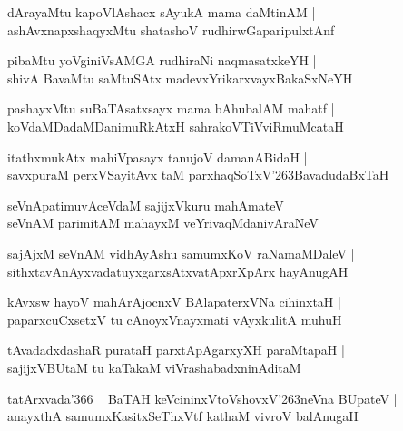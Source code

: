 \documentclass[twoside,12pt,openright]{book}
\def\S{\char'263}
\newcounter{shloka}[chapter]
\begin{document}
\begin{shloka}%
dArayaMtu kapoVlAshacx sAyukA mama daMtinAM |\\
ashAvxnapxshaqyxMtu shatashoV rudhirwGaparipulxtAnf 
\end{shloka}

\begin{shloka}%
pibaMtu yoVginiVsAMGA rudhiraNi naqmasatxkeYH |\\
shivA BavaMtu saMtuSAtx madevxYrikarxvayxBakaSxNeYH 
\end{shloka}

\begin{shloka}%
pashayxMtu suBaTAsatxsayx mama bAhubalAM mahatf |\\
koVdaMDadaMDanimuRkAtxH sahrakoVTiVviRmuMcataH 
\end{shloka}

\begin{shloka}%
itathxmukAtx mahiVpasayx tanujoV damanABidaH |\\
savxpuraM perxVSayitAvx taM parxhaqSoTxV\S BavadudaBxTaH
\end{shloka}

\begin{shloka}%
seVnApatimuvAceVdaM sajijxVkuru mahAmateV |\\
seVnAM parimitAM mahayxM veYrivaqMdanivAraNeV 
\end{shloka}

\begin{shloka}%
sajAjxM seVnAM vidhAyAshu samumxKoV raNamaMDaleV |\\
sithxtavAnAyxvadatuyxgarxsAtxvatApxrXpArx hayAnugAH
\end{shloka}

\begin{shloka}%
kAvxsw hayoV mahArAjocnxV BAlapaterxVNa cihinxtaH |\\
paparxcuCxsetxV tu cAnoyxVnayxmati vAyxkulitA muhuH 
\end{shloka}

\begin{shloka}%
tAvadadxdashaR purataH parxtApAgarxyXH paraMtapaH |\\
sajijxVBUtaM tu kaTakaM viVrashabadxninAditaM 
\end{shloka}

\begin{shloka}%
tatArxvada\char'366 ~ BaTAH keVcininxVtoVshovxV\S neVna BUpateV |\\
anayxthA samumxKasitxSeThxVtf kathaM vivroV balAnugaH
\end{shloka}
\end{document}
